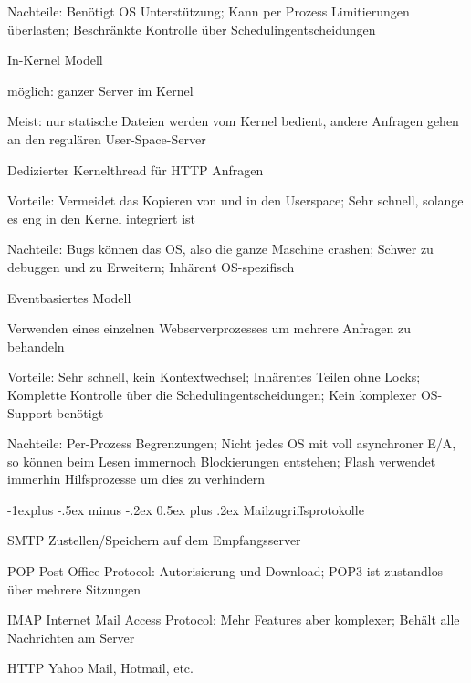\documentclass[10pt,landscape]{article}
\makeatletter
\renewcommand{\subsection}{\@startsection{subsection}{2}{0mm}%
                                {-1explus -.5ex minus -.2ex}%
                                {0.5ex plus .2ex}%
                                {\normalfont\normalsize\bfseries}}
\makeatother
\begin{document}
\begin{multicols}{3}
\begin{enumerate*}
\begin{itemize*}
            \item Nachteile: Benötigt OS Unterstützung; Kann per Prozess Limitierungen überlasten; Beschränkte Kontrolle über Schedulingentscheidungen
        \end{itemize*}
        \item In-Kernel Modell
        \begin{itemize*}
            \item möglich: ganzer Server im Kernel
            \item Meist: nur statische Dateien werden vom Kernel bedient, andere Anfragen gehen an den regulären User-Space-Server
            \item Dedizierter Kernelthread für HTTP Anfragen
            \item Vorteile: Vermeidet das Kopieren von und in den Userspace; Sehr schnell, solange es eng in den Kernel integriert ist
            \item Nachteile: Bugs können das OS, also die ganze Maschine crashen; Schwer zu debuggen und zu Erweitern; Inhärent OS-spezifisch
        \end{itemize*}
        \item Eventbasiertes Modell
        \begin{itemize*}
            \item Verwenden eines einzelnen Webserverprozesses um mehrere Anfragen zu behandeln
            \item Vorteile: Sehr schnell, kein Kontextwechsel; Inhärentes Teilen ohne Locks; Komplette Kontrolle über die Schedulingentscheidungen; Kein komplexer OS-Support benötigt
            \item Nachteile: Per-Prozess Begrenzungen; Nicht jedes OS mit voll asynchroner E/A, so können beim Lesen immernoch Blockierungen entstehen; Flash verwendet immerhin Hilfsprozesse um dies zu verhindern
        \end{itemize*}
    \end{enumerate*}
    
    \subsection{Mailzugriffsprotokolle}
    \begin{description*}
        \item[SMTP] Zustellen/Speichern auf dem Empfangsserver
        \item[POP] Post Office Protocol: Autorisierung und Download; POP3 ist zustandlos über mehrere Sitzungen
        \item[IMAP] Internet Mail Access Protocol: Mehr Features aber komplexer; Behält alle Nachrichten am Server
        \item[HTTP] Yahoo Mail, Hotmail, etc.
    \end{description*}
    

\end{multicols}
\end{document}
